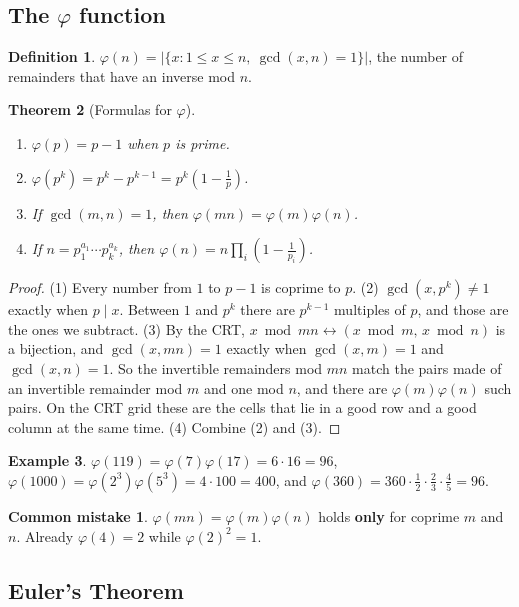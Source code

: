 \documentclass[11pt,a4paper]{article}
\newtheorem{theorem}{Theorem}[section]
\theoremstyle{definition}
\newtheorem{definition}[theorem]{Definition}
\newtheorem{example}[theorem]{Example}
\theoremstyle{noteit}
\theoremstyle{note}
\newtheorem*{mistakeX}{Common mistake}
\newenvironment{mistake}{\begin{mistakeX}\leavevmode\marginpar{\raggedleft\vspace*{-0.9\baselineskip}\dbend}\ignorespaces}{\end{mistakeX}}
\begin{document}
\subsection{The $\varphi$ function}

\begin{definition}
$\varphi(n)=\big|\{x : 1\le x\le n,\ \gcd(x,n)=1\}\big|$, the number of remainders that have an inverse mod $n$.
\end{definition}

\begin{theorem}[Formulas for $\varphi$]
\begin{enumerate}
\item $\varphi(p)=p-1$ when $p$ is prime.
\item $\varphi(p^k)=p^k-p^{k-1}=p^k\left(1-\tfrac1p\right)$.
\item If $\gcd(m,n)=1$, then $\varphi(mn)=\varphi(m)\varphi(n)$.
\item If $n=p_1^{a_1}\cdots p_k^{a_k}$, then $\varphi(n)=n\prod_{i}\left(1-\tfrac1{p_i}\right)$.
\end{enumerate}
\end{theorem}
\begin{proof}
(1) Every number from $1$ to $p-1$ is coprime to $p$.
(2) $\gcd(x,p^k)\ne1$ exactly when $p\mid x$. Between $1$ and $p^k$ there are $p^{k-1}$ multiples of $p$, and those are the ones we subtract.
(3) By the CRT, $x\bmod mn\leftrightarrow(x\bmod m,\,x\bmod n)$ is a bijection, and $\gcd(x,mn)=1$ exactly when $\gcd(x,m)=1$ and $\gcd(x,n)=1$. So the invertible remainders mod $mn$ match the pairs made of an invertible remainder mod $m$ and one mod $n$, and there are $\varphi(m)\varphi(n)$ such pairs. On the CRT grid these are the cells that lie in a good row and a good column at the same time.
(4) Combine (2) and (3).
\end{proof}

\begin{example}
$\varphi(119)=\varphi(7)\varphi(17)=6\cdot16=96$, $\varphi(1000)=\varphi(2^3)\varphi(5^3)=4\cdot100=400$, and $\varphi(360)=360\cdot\frac12\cdot\frac23\cdot\frac45=96$.
\end{example}

\begin{mistake}
$\varphi(mn)=\varphi(m)\varphi(n)$ holds \textbf{only} for coprime $m$ and $n$. Already $\varphi(4)=2$ while $\varphi(2)^2=1$.
\end{mistake}

\subsection{Euler's Theorem}
\end{document}
